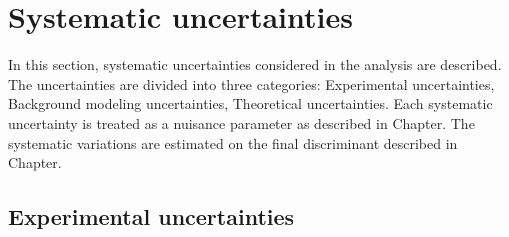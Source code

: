\chapter{Systematic uncertainties}
In this section, systematic uncertainties considered in the analysis are described. The uncertainties are divided into three categories:
Experimental uncertainties, Background modeling uncertainties, Theoretical uncertainties. Each systematic uncertainty is treated as a nuisance parameter as described in Chapter{}. The systematic variations are estimated on the final discriminant described in Chapter{}.

\section{Experimental uncertainties}

